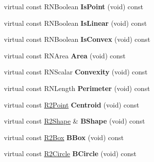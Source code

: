 \begin{DoxyCompactItemize}
\item 
virtual const R\+N\+Boolean {\bfseries Is\+Point} (void) const \hypertarget{class_r2_polygon_a732c50c0fa8884a6834c47c9afa9c1ac}{}\label{class_r2_polygon_a732c50c0fa8884a6834c47c9afa9c1ac}

\item 
virtual const R\+N\+Boolean {\bfseries Is\+Linear} (void) const \hypertarget{class_r2_polygon_a9bca214e8291c33baf5e85e7dae155eb}{}\label{class_r2_polygon_a9bca214e8291c33baf5e85e7dae155eb}

\item 
virtual const R\+N\+Boolean {\bfseries Is\+Convex} (void) const \hypertarget{class_r2_polygon_a24c5e5254f7b8f1e2f61c505b6a0e013}{}\label{class_r2_polygon_a24c5e5254f7b8f1e2f61c505b6a0e013}

\item 
virtual const R\+N\+Area {\bfseries Area} (void) const \hypertarget{class_r2_polygon_ac727e2269d73113b563b5d8cd669e46a}{}\label{class_r2_polygon_ac727e2269d73113b563b5d8cd669e46a}

\item 
virtual const R\+N\+Scalar {\bfseries Convexity} (void) const \hypertarget{class_r2_polygon_ae2d49b2b0d17f0ae735e3fb220f02577}{}\label{class_r2_polygon_ae2d49b2b0d17f0ae735e3fb220f02577}

\item 
virtual const R\+N\+Length {\bfseries Perimeter} (void) const \hypertarget{class_r2_polygon_aaeeb3eeeec230c305935c45238ff1499}{}\label{class_r2_polygon_aaeeb3eeeec230c305935c45238ff1499}

\item 
virtual const \hyperlink{class_r2_point}{R2\+Point} {\bfseries Centroid} (void) const \hypertarget{class_r2_polygon_a38e12370f03169739f562f21b492790e}{}\label{class_r2_polygon_a38e12370f03169739f562f21b492790e}

\item 
virtual const \hyperlink{class_r2_shape}{R2\+Shape} \& {\bfseries B\+Shape} (void) const \hypertarget{class_r2_polygon_aa6a4e6cb57e677742b0d3c7c7e7b0a9d}{}\label{class_r2_polygon_aa6a4e6cb57e677742b0d3c7c7e7b0a9d}

\item 
virtual const \hyperlink{class_r2_box}{R2\+Box} {\bfseries B\+Box} (void) const \hypertarget{class_r2_polygon_a1b7101aecb8206e16e10dcdf8922bbd8}{}\label{class_r2_polygon_a1b7101aecb8206e16e10dcdf8922bbd8}

\item 
virtual const \hyperlink{class_r2_circle}{R2\+Circle} {\bfseries B\+Circle} (void) const \hypertarget{class_r2_polygon_a0b46763c8d38b73aea3bc8bdf36e4891}{}\label{class_r2_polygon_a0b46763c8d38b73aea3bc8bdf36e4891}


\end{DoxyCompactItemize}
